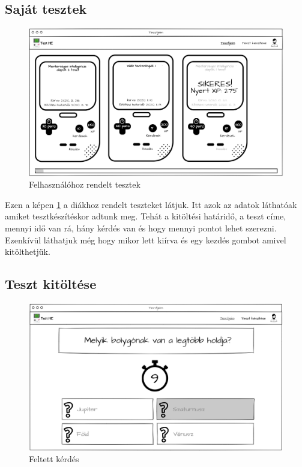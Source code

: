 \subsection{Saját tesztek}
\begin{figure}[H]
    \centering
    \includegraphics[width=\linewidth]{images/my_tests_wireframe.png}
    \caption{Felhasználóhoz rendelt tesztek}
    \label{fig:my_tests}
\end{figure}

Ezen a képen \ref{fig:my_tests} a diákhoz rendelt teszteket látjuk. Itt azok az adatok láthatóak amiket tesztkészítéskor adtunk meg. Tehát a kitöltési határidő, a teszt címe, mennyi idő van rá, hány kérdés van és hogy mennyi pontot lehet szerezni. Ezenkívül láthatjuk még hogy mikor lett kiírva és egy kezdés gombot amivel kitölthetjük.

\subsection{Teszt kitöltése}

\begin{figure}[H]
    \centering
    \includegraphics[width=\linewidth]{images/test1_wireframe.png}
    \caption{Feltett kérdés}
    \label{fig:test_question}
\end{figure}

